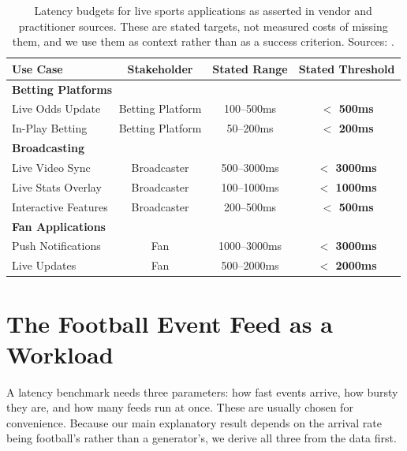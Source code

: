 \documentclass[Afour,sageh,times]{sagej}
\begin{document}
\begin{table}[htbp]
\centering
\caption{Latency budgets for live sports applications as asserted in vendor and practitioner
sources. These are stated targets, not measured costs of missing them, and we use them as
context rather than as a success criterion. Sources:
\cite{v2solutions2025,ververica2025,dolby2025,promwad2025}.}
\label{tab:latency_requirements}
\begin{tabular}{lccc}
\toprule
Use Case & Stakeholder & Stated Range & Stated Threshold \\
\midrule
\multicolumn{4}{l}{\textbf{Betting Platforms}} \\
\hspace{1em}Live Odds Update & Betting Platform & 100--500ms & \textbf{$<$ 500ms} \\
\hspace{1em}In-Play Betting & Betting Platform & 50--200ms & \textbf{$<$ 200ms} \\
\midrule
\multicolumn{4}{l}{\textbf{Broadcasting}} \\
\hspace{1em}Live Video Sync & Broadcaster & 500--3000ms & \textbf{$<$ 3000ms} \\
\hspace{1em}Live Stats Overlay & Broadcaster & 100--1000ms & \textbf{$<$ 1000ms} \\
\hspace{1em}Interactive Features & Broadcaster & 200--500ms & \textbf{$<$ 500ms} \\
\midrule
\multicolumn{4}{l}{\textbf{Fan Applications}} \\
\hspace{1em}Push Notifications & Fan & 1000--3000ms & \textbf{$<$ 3000ms} \\
\hspace{1em}Live Updates & Fan & 500--2000ms & \textbf{$<$ 2000ms} \\
\bottomrule
\end{tabular}
\end{table}


\section{The Football Event Feed as a Workload}
\label{sec:workload}

A latency benchmark needs three parameters: how fast events arrive, how bursty they are, and how
many feeds run at once. These are usually chosen for convenience. Because our main explanatory
result depends on the arrival rate being football's rather than a generator's, we derive all
three from the data first.
\end{document}
